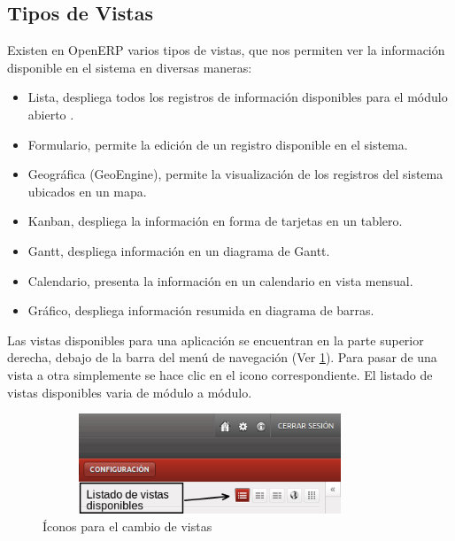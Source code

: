 \subsection{Tipos de Vistas}
Existen en OpenERP varios tipos de vistas, que nos permiten ver la información disponible en el sistema en diversas maneras:
\begin{itemize}
 \item Lista, despliega todos los registros de información disponibles para el módulo abierto .
 \item Formulario, permite la edición de un registro disponible en el sistema.
 \item Geográfica (GeoEngine), permite la visualización de los registros del sistema ubicados en un mapa.
 \item Kanban, despliega la información en forma de tarjetas en un tablero.
 \item Gantt, despliega información en un diagrama de Gantt.
 \item Calendario, presenta la información en un calendario en vista mensual.
 \item Gráfico, despliega información resumida en diagrama de barras.
\end{itemize}
Las vistas disponibles para una aplicación se encuentran en la parte superior derecha, debajo de la barra del menú de navegación (Ver \ref{fig:barravistas}).
Para pasar de una vista a otra simplemente se hace clic en el icono correspondiente. El listado de vistas disponibles varia de módulo a módulo.
\begin{figure}[H]
 \centering
 \includegraphics[width=10cm,height=3cm]{./Imagenes/barravistas.png}
 \caption{Íconos para el cambio de vistas}
 \label{fig:barravistas}
\end{figure}

